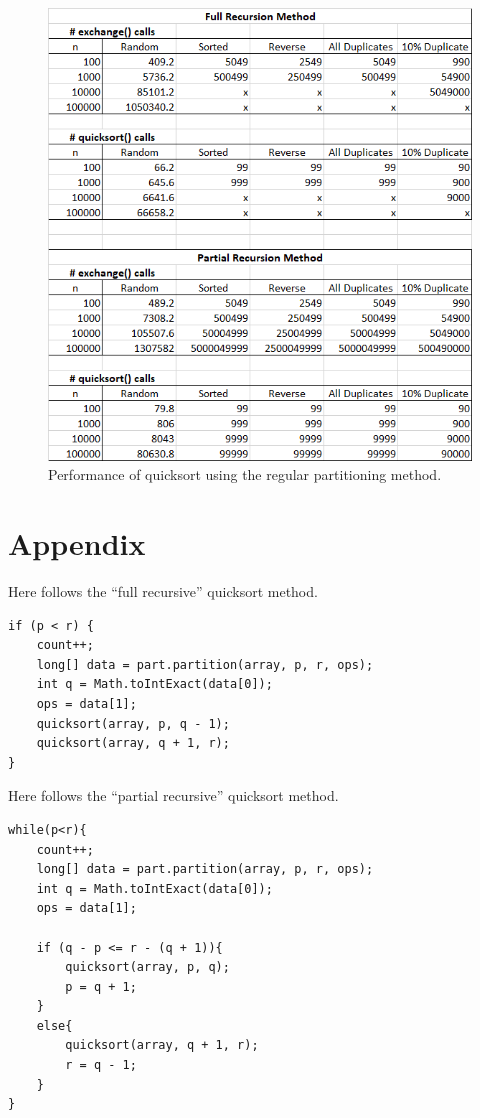 \documentclass[11pt]{article}
\begin{document}
\begin{figure} [htbp!]
	\centering
	\includegraphics[width=\textwidth]{regPart-table}
	\caption{Performance of quicksort using the regular partitioning method.}
\end{figure}

\clearpage

\section{Appendix}
Here follows the ``full recursive'' quicksort method.
\begin{lstlisting}
if (p < r) {
	count++;
	long[] data = part.partition(array, p, r, ops);
	int q = Math.toIntExact(data[0]);
	ops = data[1];
	quicksort(array, p, q - 1);
	quicksort(array, q + 1, r);
}
\end{lstlisting}

Here follows the ``partial recursive'' quicksort method.
\begin{lstlisting}
while(p<r){
	count++;
	long[] data = part.partition(array, p, r, ops);
	int q = Math.toIntExact(data[0]);
	ops = data[1];
	
	if (q - p <= r - (q + 1)){
		quicksort(array, p, q);
		p = q + 1;
	}
	else{
		quicksort(array, q + 1, r);
		r = q - 1;
	}
}
\end{lstlisting}
\end{document}
